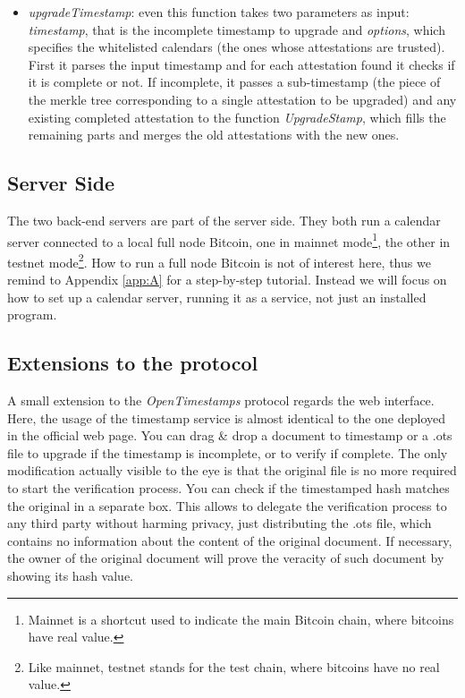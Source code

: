 \begin{itemize}
    \item \textit{upgradeTimestamp}: even this function takes two parameters as input: \textit{timestamp}, that is the incomplete timestamp to upgrade and \textit{options}, which specifies the whitelisted calendars (the ones whose attestations are trusted). First it parses the input timestamp and for each attestation found it checks if it is complete or not. If incomplete, it passes a sub-timestamp (the piece of the merkle tree corresponding to a single attestation to be upgraded) and any existing completed attestation to the function \textit{UpgradeStamp}, which fills the remaining parts and merges the old attestations with the new ones.
\end{itemize}

\bigskip
\subsection{Server Side}
\label{sec:server-side}
The two back-end servers are part of the server side. They both run a calendar server connected to a local full node Bitcoin, one in mainnet mode\footnote{Mainnet is a shortcut used to indicate the main Bitcoin chain, where bitcoins have real value.}, the other in testnet mode\footnote{Like mainnet, testnet stands for the test chain, where bitcoins have no real value.}. How to run a full node Bitcoin is not of interest here, thus we remind to Appendix \ref{app:A} for a step-by-step tutorial. Instead we will focus on how to set up a calendar server, running it as a service, not just an installed program.

\bigskip
\subsection{Extensions to the protocol}
\label{sec:extensions}
A small extension to the \textit{OpenTimestamps} protocol regards the web interface. Here, the usage of the timestamp service is almost identical to the one deployed in the official web page. You can drag \& drop a document to timestamp or a \colorbox{light-gray}{.ots} file to upgrade if the timestamp is incomplete, or to verify if complete. The only modification actually visible to the eye is that the original file is no more required to start the verification process. You can check if the timestamped hash matches the original in a separate box. This allows to delegate the verification process to any third party without harming privacy, just distributing the \colorbox{light-gray}{.ots} file, which contains no information about the content of the original document. If necessary, the owner of the original document will prove the veracity of such document by showing its hash value.

